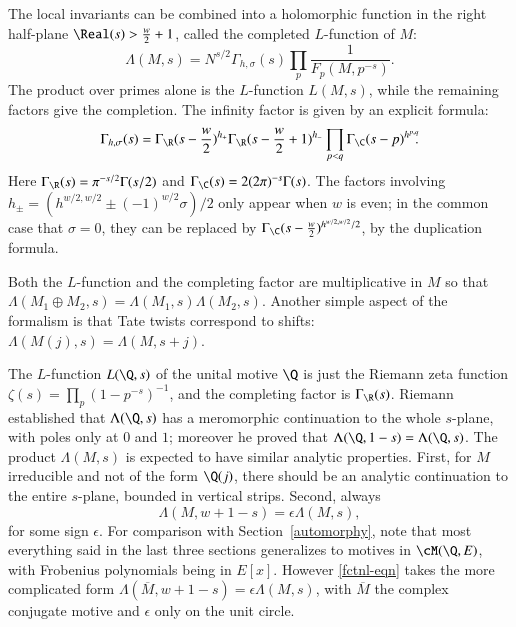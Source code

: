 \documentclass{notices}
\numberwithin{equation}{section}
\numberwithin{table}{section}
\numberwithin{figure}{section}
\begin{document}
{   The local invariants can be combined into 
a holomorphic function in the right half-plane
$\Real(s)>\frac{w}{2}+1$, called the completed
$L$-function of $M$:
\begin{equation}
\label{Lprod}
\Lambda(M,s) = N^{s/2} \Gamma_{h,\sigma}(s) \prod_p \frac{1}{F_p(M,p^{-s})}.
\end{equation}
The product over primes alone is the 
$L$-function $L(M,s)$, while the remaining factors give the 
completion.  The infinity factor is given by an explicit 
formula: 
\begin{equation} 
\label{inffact}
\Gamma_{h,\sigma}(s) = \Gamma_\R(s-\frac{w}{2})^{h_+} \Gamma_\R(s-\frac{w}{2}+1)^{h_-} \prod_{p<q} \Gamma_\C(s-p)^{h^{p,q}}  \!\! .
\end{equation}
Here 
$\Gamma_\R(s)  = \pi^{-s/2} \Gamma(s/2)$ and
$\Gamma_\C(s) = 2 (2 \pi)^{-s} \Gamma(s)$.
 The factors involving $h_\pm = (h^{w/2,w/2} \pm (-1)^{w/2} \sigma)/2$ only appear when $w$ is even; in the common case that
$\sigma = 0$, they can be replaced by $\Gamma_\C(s-\frac{w}{2})^{h^{w/2,w/2}/2}$, by the duplication
formula.  

Both the $L$-function and the completing factor are
multiplicative in $M$ so that $\Lambda(M_1 \oplus M_2,s) = \Lambda(M_1,s) \Lambda(M_2,s)$.
Another simple aspect of the formalism is that Tate twists correspond
to shifts: $\Lambda(M(j),s) = \Lambda(M,s+j)$.  

     The $L$-function $L(\Q,s)$ of the unital motive $\Q$ is just the Riemann zeta function
 $\zeta(s) = \prod_{p} (1-p^{-s})^{-1}$, and the completing factor is $\Gamma_\R(s)$.  
 Riemann established that $\Lambda(\Q,s)$ has a meromorphic continuation to the
 whole $s$-plane, with poles only at $0$ and $1$; moreover he proved that 
 $\Lambda(\Q,1-s) = \Lambda(\Q,s)$. The product $\Lambda(M,s)$ is expected to have similar analytic properties.   First, for $M$
irreducible and not of the form $\Q(j)$, there should be an analytic continuation
to the entire $s$-plane, bounded in vertical strips.  Second, always
\begin{equation}
\label{fctnl-eqn}
\Lambda(M,w+1-s)=\epsilon\Lambda(M,s),
\end{equation}
for some sign $\epsilon$.   For comparison with Section~\ref{automorphy},
note that most everything said in the last three sections generalizes
to motives in $\cM(\Q,E)$, with Frobenius polynomials being in $E[x]$.   However 
\eqref{fctnl-eqn} takes 
the more complicated form $\Lambda(\overline{M},w+1-s)=\epsilon\Lambda(M,s)$,
with $\overline{M}$ the complex conjugate motive and $\epsilon$ only on the unit circle.  

}
\end{document}

